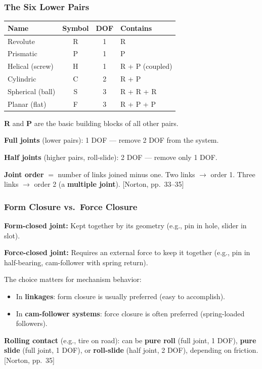 \documentclass[10pt,aspectratio=43]{beamer}
\newcommand{\pref}[1]{\vfill\hfill{\scriptsize\color{gray}[Norton, pp.~#1]}}
\begin{document}
\begin{frame}
\frametitle{The Six Lower Pairs}

\begin{center}
\small
\begin{tabular}{l|c|c|l}
\toprule
\textbf{Name} & \textbf{Symbol} & \textbf{DOF} & \textbf{Contains} \\
\midrule
Revolute & R & 1 & R \\
Prismatic & P & 1 & P \\
Helical (screw) & H & 1 & R + P (coupled) \\
Cylindric & C & 2 & R + P \\
Spherical (ball) & S & 3 & R + R + R \\
Planar (flat) & F & 3 & R + P + P \\
\bottomrule
\end{tabular}
\end{center}

\vspace{6pt}
\textbf{R} and \textbf{P} are the basic building blocks of all other pairs.

\vspace{4pt}
\textbf{Full joints} (lower pairs): 1 DOF --- remove 2 DOF from the system.

\textbf{Half joints} (higher pairs, roll-slide): 2 DOF --- remove only 1 DOF.

\vspace{4pt}
\textbf{Joint order} $=$ number of links joined minus one. Two links $\to$ order 1. Three links $\to$ order 2 (a \textbf{multiple joint}).
\pref{33--35}
\end{frame}

\begin{frame}
\frametitle{Form Closure vs.\ Force Closure}

\begin{yellowbox}
\textbf{Form-closed joint:} Kept together by its geometry (e.g., pin in hole, slider in slot).

\textbf{Force-closed joint:} Requires an external force to keep it together (e.g., pin in half-bearing, cam-follower with spring return).
\end{yellowbox}

\vspace{6pt}
The choice matters for mechanism behavior:
\begin{itemize}
  \item In \textbf{linkages}: form closure is usually preferred (easy to accomplish).
  \item In \textbf{cam-follower systems}: force closure is often preferred (spring-loaded followers).
\end{itemize}

\vspace{6pt}
\textbf{Rolling contact} (e.g., tire on road): can be \textbf{pure roll} (full joint, 1 DOF), \textbf{pure slide} (full joint, 1 DOF), or \textbf{roll-slide} (half joint, 2 DOF), depending on friction.
\pref{35}
\end{frame}
\end{document}

